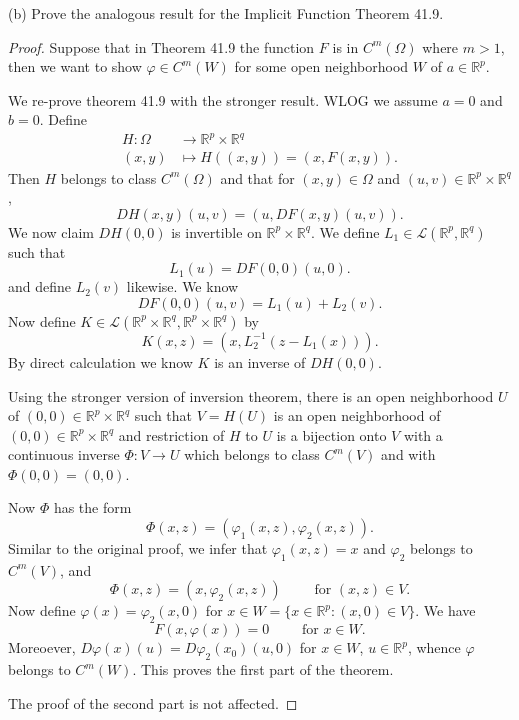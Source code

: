 \begin{itemize}
(b) Prove the analogous result for the Implicit Function Theorem 41.9.
\begin{proof}
	Suppose that in Theorem 41.9 the function $F$ is in $C^{m}(\Omega)$ where $m>1$, then we want to show $\varphi \in C^m(W)$ for some open neighborhood $W$ of $a \in \mathbb{R}^p$.

	We re-prove theorem 41.9 with the stronger result.
	WLOG we assume $a=0$ and $b=0$. Define 
	 \begin{align*}
		H: \Omega &\longrightarrow \mathbb{R}^p \times \mathbb{R}^q \\
		(x,y) &\longmapsto H((x,y)) = \left(x,F(x,y)\right)
	.\end{align*}
	Then $H$ belongs to class $C^{m}(\Omega)$ and that for $(x,y) \in \Omega$ and $(u,v) \in \mathbb{R}^p \times \mathbb{R}^q$,
	 \[
		D H(x,y)(u,v) = \left( u, D F(x,y)(u,v) \right) 
	.\] 
	We now claim $D H(0,0)$ is invertible on $\mathbb{R}^p \times \mathbb{R}^q$. We define
	$ L_1 \in \mathcal{L}(\mathbb{R}^p, \mathbb{R}^q)$ such that 
	\[
		L_1(u) = D F(0,0)(u,0)
	.\] 
	and define $L_2(v)$ likewise. We know
	 \[
		D F(0,0)(u,v) = L_1(u) + L_2(v)
	.\] 
	Now define $K \in \mathcal{L}\left( \mathbb{R}^p \times \mathbb{R}^q, \mathbb{R}^p \times \mathbb{R}^q  \right) $ by
	\[
		K(x,z) = \left( x, L_2^{-1} \left( z - L_1(x) \right)  \right) 
	.\] 
	By direct calculation we know $K$ is an inverse of $D H(0,0)$. 

	Using the stronger version of inversion theorem, there is an open neighborhood $U$ of $(0,0) \in \mathbb{R}^{p} \times \mathbb{R}^q$ such that $V = H(U)$ is an open neighborhood of $(0,0) \in \mathbb{R}^p \times \mathbb{R}^q$ and restriction of $H$ to $U$ is a bijection onto $V$ with a continuous inverse $\Phi: V \to  U$ which belongs to class $C^{m}(V)$ and with $\Phi(0,0) = (0,0)$.

	Now  $\Phi$ has the form
	\[
		\Phi(x,z) = \left( \varphi_1(x,z), \varphi_2(x,z) \right) 
	.\] 
	Similar to the original proof, we infer that $\varphi_1(x, z) = x$ and $\varphi_2$ belongs to $C^m(V)$,  and
\[
	\Phi(x,z) = \left( x, \varphi_2(x,z) \right) \qquad \text{ for }(x,z) \in V
.\] 
	Now define $\varphi(x) = \varphi_2(x,0)$ for $x \in W = \{x \in \mathbb{R}^p: (x,0) \in V\} $. We have
	\[
		F(x, \varphi(x)) = 0 \qquad \text{ for }x \in W
	.\] 
	Moreoever, $D\varphi(x)(u) = D\varphi_2(x_0)(u,0)$ for $x \in W$, $u \in \mathbb{R}^p$, whence $\varphi$ belongs to $C^m(W)$. This proves the first part of the theorem.

	The proof of the second part is not affected.
\end{proof}


\end{itemize}

